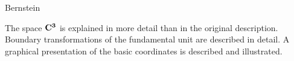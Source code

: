 \documentclass[preprint]{iucr}              %
\numberwithin{equation}{section}
\newcommand{\CIII}[0]{$\bf{C^{3}}$}
\begin{document}
	
	\author[b]{Herbert J.}{Bernstein}
	
	
	
	
	
	
	
	\keyword{\CIII}
	
	
	
	\maketitle                        %
	
	\begin{synopsis}
		The space \CIII{} is explained in more detail than
		in the original description. Boundary transformations
		of the fundamental unit are described in detail. 
		A graphical presentation of the basic coordinates
		is described and illustrated.
	\end{synopsis}
	\newcommand{\si}[0]{$s_1$}
	\newcommand{\sii}[0]{$s_2$}
	\newcommand{\siii}[0]{$s_3$}
	\newcommand{\siv}[0]{$s_4$}
	\newcommand{\sv}[0]{$s_5$}
	\newcommand{\svi}[0]{$s_6$}
	\newcommand{\Svec} [0] {\{\si, \sii, \siii, \siv, \sv, \svi \}}
	\newcommand{\SvecA} [0] {\{-\si, -\si+\sii, \si+\siii, \si+\sv, \si+\siv, \si+\svi \}}
	
\end{document}
